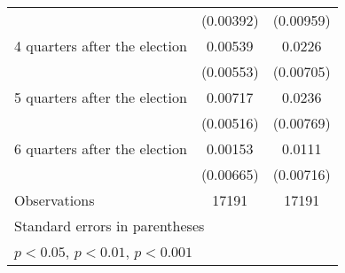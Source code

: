 \begin{table}[htbp]
\begin{tabular}{l*{2}{c}}
                    &   (0.00392)         &   (0.00959)         \\
[1em]
 4 quarters after the election&     0.00539         &      0.0226\sym{**} \\
                    &   (0.00553)         &   (0.00705)         \\
[1em]
 5 quarters after the election&     0.00717         &      0.0236\sym{**} \\
                    &   (0.00516)         &   (0.00769)         \\
[1em]
 6 quarters after the election&     0.00153         &      0.0111         \\
                    &   (0.00665)         &   (0.00716)         \\
\hline
Observations        &       17191         &       17191         \\
\hline\hline
\multicolumn{3}{l}{\footnotesize Standard errors in parentheses}\\
\multicolumn{3}{l}{\footnotesize \sym{*} \(p<0.05\), \sym{**} \(p<0.01\), \sym{***} \(p<0.001\)}\\
\end{tabular}
\end{table}
